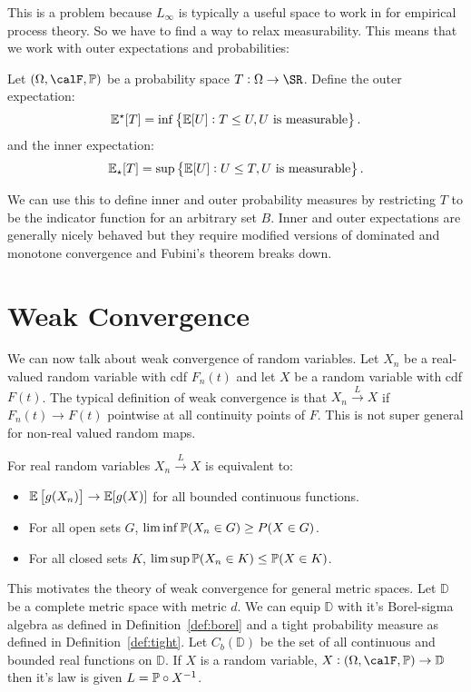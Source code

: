 This is a problem because \(L_\infty\) is typically a useful space to work in for empirical process theory. So we have to find a way to relax measurability. This means that we work with outer expectations and probabilities:
\begin{definition}
	Let \((\Omega,\calF,\P)\) be a probability space \(T:\Omega \to \SR\). Define the outer expectation:
	 \[
		 \E^\star[T] = \inf\left\{\E[U]: T\leq U, U\text{ is measurable}\right\}
	.\]
	and the inner expectation:
	\[
		\E_\star[T] = \sup\left\{\E[U]: U\leq T, U\text{ is measurable}\right\}
	.\] 
\end{definition}
We can use this to define inner and outer probability measures by restricting \(T\) to be the indicator function for an arbitrary set  \(B\). Inner and outer expectations are generally nicely behaved but they require modified versions of dominated and monotone convergence and Fubini's theorem breaks down.

\section{Weak Convergence}%
\label{sec:weak-convergence}

We can now talk about weak convergence of random variables. Let \(X_n\) be a real-valued random variable with cdf  \(F_n(t)\) and let  \(X\) be a random variable with cdf  \(F(t)\). The typical definition of weak convergence is that \(X_n \overset{L}{\to} X\) if  \(F_n(t) \to F(t)\) pointwise at all continuity points of  \(F\). This is not super general for non-real valued random maps.

\begin{theorem}[Portmanteau]
	\label{thm:portmanteau}
	For real random variables \(X_n\overset{L}{\to}X\) is equivalent to:
	 \begin{itemize}
		 \item \(\E\left[g(X_n)\right] \to \E[g(X)]\) for all bounded continuous functions. 
		 \item For all open sets \(G\),  \(\lim\inf \P(X_n\in G) \geq P(X\in G)\).
		 \item For all closed sets \(K\),  \(\lim\sup \P(X_n \in K) \leq \P(X \in K)\).
	\end{itemize}
\end{theorem}

This motivates the theory of weak convergence for general metric spaces. Let \(\mathbb{D}\) be a complete metric space with metric  \(d\). We can equip \(\mathbb{D}\) with it's Borel-sigma algebra as defined in Definition~\ref{def:borel} and a tight probability measure as defined in Definition~\ref{def:tight}. Let  \(C_b\left(\mathbb{D}\right)\) be the set of all continuous and bounded real functions on \(\mathbb{D}\). If \(X\) is a random variable,  \(X:(\Omega,\calF,\P) \to \mathbb{D}\) then it's law is given \(L = \P\circ X^{-1}\).


